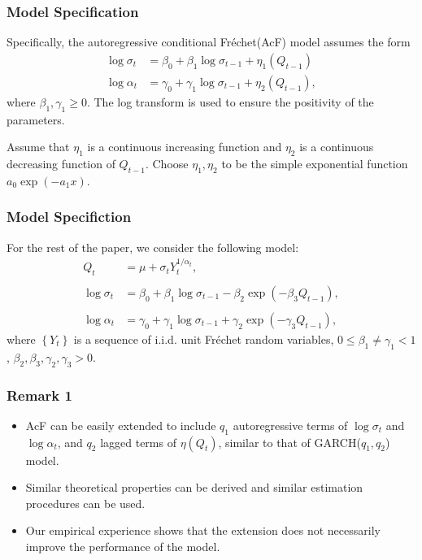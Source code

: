\documentclass{beamer}
\newcommand{\suit}[1]{\left(#1\right)}
\newcommand{\set}[1]{\left\{#1\right\}}
\begin{document}
\begin{frame}
    \frametitle{Model Specification}
    Specifically, the autoregressive conditional Fr\'echet(AcF) model assumes the form  
    $$
\begin{aligned}
 \log \sigma_t & = \beta_0 +\beta_1 \log \sigma_{t-1}+\eta_1(Q_{t-1}) \\
    \log \alpha_t &=\gamma_0+\gamma_1 \log \sigma_{t-1}+\eta_2(Q_{t-1}) ,
\end{aligned}
    $$
    where $\beta_1,\gamma_1\ge 0$. The log
    transform is used to ensure the positivity of the parameters.

    \bigskip

    Assume that $\eta_1$ is a continuous increasing function and $\eta_2$ is a continuous decreasing function of $Q_{t-1}$. Choose $\eta_1,\eta_2$ to be the simple exponential function $a_0\exp\suit{-a_1 x}$.
\end{frame}

\begin{frame}
    \frametitle{Model Specifiction}

    For the rest of the paper, we consider the following model:
  \begin{equation}\tag{*}
\begin{aligned}
    Q_t& = \mu +\sigma_t Y_t^{1/\alpha_t}, \\
    & \\
 \log \sigma_t & = \beta_0 +\beta_1 \log \sigma_{t-1}-\beta_2\exp(-\beta_3 Q_{t-1}), \\
 & \\
    \log \alpha_t &=\gamma_0+\gamma_1 \log \sigma_{t-1}+\gamma_2\exp(-\gamma_3 Q_{t-1}) ,
\end{aligned}
\end{equation}
where $\set{Y_t}$ is a sequence of i.i.d. unit Fr\'echet random variables, $0\le \beta_1 \ne \gamma_1<1$, $\beta_2, \beta_3,\gamma_2,\gamma_3>0$.
\end{frame}


\begin{frame}
    \frametitle{Remark 1}
    \begin{itemize}
        \item AcF can be easily extended to include $q_1$ autoregressive terms of $\log \sigma_t$ and $\log \alpha_t$, and $q_2$ lagged terms of $\eta(Q_t)$, similar to that of GARCH($q_1,q_2$) model.
        \bigskip
        \item Similar theoretical properties can be derived and similar estimation procedures can be used.
        \bigskip
        \item Our empirical experience shows that the extension does not necessarily improve the performance of the model.
    \end{itemize}

    

\end{frame}
\end{document}
